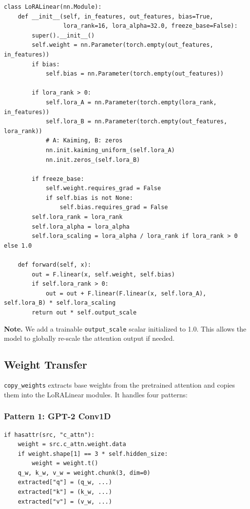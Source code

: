 \begin{lstlisting}
class LoRALinear(nn.Module):
    def __init__(self, in_features, out_features, bias=True, 
                 lora_rank=16, lora_alpha=32.0, freeze_base=False):
        super().__init__()
        self.weight = nn.Parameter(torch.empty(out_features, in_features))
        if bias:
            self.bias = nn.Parameter(torch.empty(out_features))
        
        if lora_rank > 0:
            self.lora_A = nn.Parameter(torch.empty(lora_rank, in_features))
            self.lora_B = nn.Parameter(torch.empty(out_features, lora_rank))
            # A: Kaiming, B: zeros
            nn.init.kaiming_uniform_(self.lora_A)
            nn.init.zeros_(self.lora_B)
        
        if freeze_base:
            self.weight.requires_grad = False
            if self.bias is not None:
                self.bias.requires_grad = False
        self.lora_rank = lora_rank
        self.lora_alpha = lora_alpha
        self.lora_scaling = lora_alpha / lora_rank if lora_rank > 0 else 1.0
    
    def forward(self, x):
        out = F.linear(x, self.weight, self.bias)
        if self.lora_rank > 0:
            out = out + F.linear(F.linear(x, self.lora_A), self.lora_B) * self.lora_scaling
        return out * self.output_scale
\end{lstlisting}

\textbf{Note.} We add a trainable \texttt{output\_scale} scalar initialized to 1.0. This 
allows the model to globally re-scale the attention output if needed.

\subsection{Weight Transfer}

\texttt{copy\_weights} extracts base weights from the pretrained attention and 
copies them into the LoRALinear modules. It handles four patterns:

\subsubsection{Pattern 1: GPT-2 Conv1D}

\begin{lstlisting}
if hasattr(src, "c_attn"):
    weight = src.c_attn.weight.data
    if weight.shape[1] == 3 * self.hidden_size:
        weight = weight.t()
    q_w, k_w, v_w = weight.chunk(3, dim=0)
    extracted["q"] = (q_w, ...)
    extracted["k"] = (k_w, ...)
    extracted["v"] = (v_w, ...)
\end{lstlisting}

